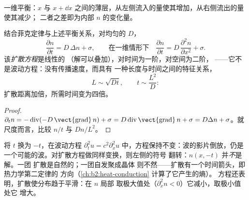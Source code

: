 \begin{omfigure}

{\small 一维平衡：$x$ 与 $x + \dd
x$ 之间的薄层，从左侧流入的量使其增加，从右侧流出的量使其减少；
二者之差即为内部 $n$ 的变化量。}
\end{omfigure}

\begin{theorem}[扩散方程]\label{thm:b2:particle-diffusion:equation}
结合菲克定律与上述平衡关系，对均匀的 $D$，
\[
\frac{\partial n}{\partial t} = D\,\Delta n + \sigma ,
\qquad\text{在一维情形下}\quad
\frac{\partial n}{\partial t} = D\,\frac{\partial^2 n}{\partial x^2} + \sigma .
\]
该\emph{扩散方程}是线性的
（解可以叠加），对时间为一阶，对空间为二阶，
——它不是波动方程：没有传播速度，而具有
一种长度与时间之间的特征关系，
\[
L \sim \sqrt{D t}, \qquad t \sim \frac{L^2}{D} :
\]
扩散距离加倍，所需时间变为四倍。
\end{theorem}

\begin{proof}
$\partial_t n = -\operatorname{div}(-D\,\vect{\operatorname{grad}}\,n) +
\sigma = D\operatorname{div}\vect{\operatorname{grad}}\,n + \sigma = D\Delta
n + \sigma$。就尺度而言，比较 $n/t$ 与 $Dn/L^2$。
\end{proof}

\begin{remark}[扩散是不可逆的]\label{rem:b2:particle-diffusion:irreversible}
将 $t$ 换为 $-t$，在波动方程 $\partial_t^2 u = c^2
\partial_x^2 u$ 中，方程保持不变：波的影片倒放，仍是
一个可能的波。对扩散方程做同样变换，则左侧的符号
翻转：$n(x,-t)$ 并\emph{不}是解。一团
扩散是自然的；一团自发聚成晶体
则不然——扩散有一个时间箭头，即热力学第二定律的
方向（\cref{ch:b2:heat-conduction} 计算了它产生的熵）。
方程还表明，扩散使分布趋于平滑：在 $n$ 局部
取极大值处（$\partial_x^2 n < 0$）它减小，取极小值处它
增大。
\end{remark}

